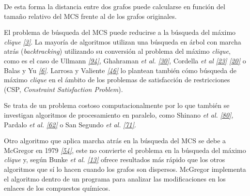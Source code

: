 \documentclass[a4paper,12pt,spanish]{book}
\begin{document}
De esta forma la distancia entre dos grafos puede calcularse en función del tamaño
relativo del MCS frente al de los grafos originales.

El problema de búsqueda del MCS puede reducirse a la búsqueda del máximo
\emph{clique} \label{1.state-of-the-art/ii.medidas-distancia:id5}{\hyperref[zreferences:ambler1973]{\emph{{[}3{]}}}}. La mayoría de algoritmos utilizan una búsqueda en árbol
con marcha atrás (\emph{backtracking}) utilizando su conversión al problema del máximo
\emph{clique}, como es el caso de Ullmann \label{1.state-of-the-art/ii.medidas-distancia:id6}{\hyperref[zreferences:ullmann1976]{\emph{{[}94{]}}}}, Ghahraman \emph{et al.}
\label{1.state-of-the-art/ii.medidas-distancia:id7}{\hyperref[zreferences:ghahraman1980]{\emph{{[}30{]}}}}, Cordella \emph{et al} \label{1.state-of-the-art/ii.medidas-distancia:id8}{\hyperref[zreferences:cordella2000]{\emph{{[}23{]}}}} \label{1.state-of-the-art/ii.medidas-distancia:id9}{\hyperref[zreferences:cordella1998]{\emph{{[}20{]}}}} o
Balas y Yu \label{1.state-of-the-art/ii.medidas-distancia:id10}{\hyperref[zreferences:balas1986]{\emph{{[}6{]}}}}. Larrosa y Valiente \label{1.state-of-the-art/ii.medidas-distancia:id11}{\hyperref[zreferences:larrosa2002]{\emph{{[}46{]}}}} lo plantean también
cómo búsqueda de máximo \emph{clique} en el ámbito de los problemas de satisfacción de
restricciones (CSP, \emph{Constraint Satisfaction Problem}).

Se trata de un problema costoso computacionalmente por lo que también se investigan
algoritmos de procesamiento en paralelo, como Shinano \emph{et al.} \label{1.state-of-the-art/ii.medidas-distancia:id12}{\hyperref[zreferences:shinano1998]{\emph{{[}80{]}}}},
Pardalo \emph{et al.} \label{1.state-of-the-art/ii.medidas-distancia:id13}{\hyperref[zreferences:pardalos1998]{\emph{{[}62{]}}}} o San Segundo \emph{et al.} \label{1.state-of-the-art/ii.medidas-distancia:id14}{\hyperref[zreferences:sansegundo2011]{\emph{{[}71{]}}}}.

Otro algoritmo que aplica marcha atrás en la búsqueda del MCS se debe a McGregor en
1979 \label{1.state-of-the-art/ii.medidas-distancia:id15}{\hyperref[zreferences:mcgregor1982]{\emph{{[}54{]}}}}, este no convierte el problema en la búsqueda del máximo \emph{clique}
y, según Bunke \emph{et al.} \label{1.state-of-the-art/ii.medidas-distancia:id16}{\hyperref[zreferences:bunke2002]{\emph{{[}13{]}}}} ofrece resultados más rápido que los otros
algoritmos que sí lo hacen cuando los grafos son dispersos. McGregor implementa
el algoritmo dentro de un programa para analizar las modificaciones en los enlaces de
los compuestos químicos.
\end{document}
